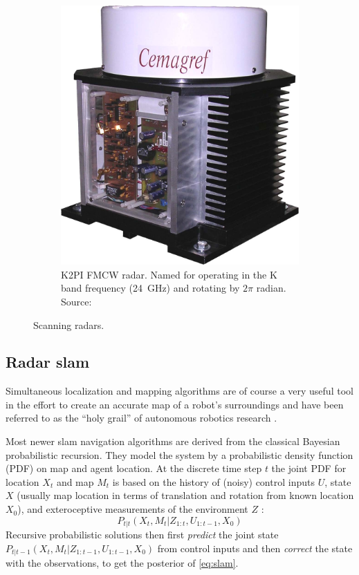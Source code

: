 \begin{figure}[htbp]
\begin{subfigure}[t]{0.3\textwidth}
        \includegraphics[max width=\linewidth]{gfx/pictures/k2pi}
        \caption{K2PI FMCW radar. Named for operating in the K band frequency (\SI{24}{GHz}) and rotating by $2\pi$ radian. Source: \cite{Rouveure2008}}
        \label{fig:k2pi}
    \end{subfigure}
    \caption{Scanning radars.}
\end{figure}


\subsection{Radar slam}\label{radar-slam}


Simultaneous localization and mapping algorithms are of course a very useful tool in the effort to create an accurate map of a robot's surroundings and have been referred to as the ``holy grail'' of autonomous robotics research \cite{Dissanayake2001}.

Most newer slam navigation algorithms are derived from the classical Bayesian probabilistic recursion. They model the system by a probabilistic density function (PDF) on map and agent location. At the discrete time step $t$ the joint PDF for location $X_t$ and map $M_t$ is based on the history of (noisy) control inputs $U$, state $X$ (usually map location in terms of translation and rotation from known location $X_0$), and exteroceptive measurements of the environment $Z$ \cite{Adams2012}:
\begin{equation} \label{eq:slam}
    P_{t|t}(X_t,M_t|Z_{1:t},U_{1:t-1},X_0)
\end{equation}
Recursive probabilistic solutions then first \textit{predict} the joint state \( P_{t|t-1}(X_t,M_t|Z_{1:t-1},U_{1:t-1},X_0) \) from control inputs and then \textit{correct} the state with the observations, to get the posterior of \cref{eq:slam}.

